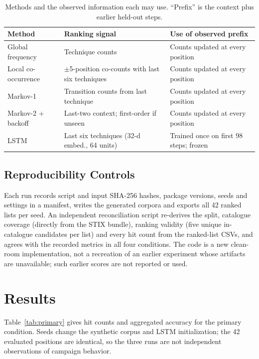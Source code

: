 \documentclass[conference]{IEEEtran}
\begin{document}
\begin{table}[!t]
\caption{Methods and the observed information each may use. ``Prefix'' is the context plus earlier held-out steps.}
\label{tab:methods}
\centering
\begin{tabular}{|l|p{4.2cm}|p{3.5cm}|}
\hline
\textbf{Method} & \textbf{Ranking signal} & \textbf{Use of observed prefix} \\
\hline
Global frequency & Technique counts & Counts updated at every position \\
Local co-occurrence & $\pm$5-position co-counts with last six techniques & Counts updated at every position \\
Markov-1 & Transition counts from last technique & Counts updated at every position \\
Markov-2 + backoff & Last-two context; first-order if unseen & Counts updated at every position \\
LSTM & Last six techniques (32-d embed., 64 units) & Trained once on first 98 steps; frozen \\
\hline
\end{tabular}
\end{table}

\subsection{Reproducibility Controls}

Each run records script and input SHA-256 hashes, package versions, seeds and settings in a manifest, writes the generated corpora and exports all 42 ranked lists per seed. An independent reconciliation script re-derives the split, catalogue coverage (directly from the STIX bundle), ranking validity (five unique in-catalogue candidates per list) and every hit count from the ranked-list CSVs, and agrees with the recorded metrics in all four conditions. The code is a new clean-room implementation, not a recreation of an earlier experiment whose artifacts are unavailable; such earlier scores are not reported or used.

\section{Results}

Table~\ref{tab:primary} gives hit counts and aggregated accuracy for the primary condition. Seeds change the synthetic corpus and LSTM initialization; the 42 evaluated positions are identical, so the three runs are not independent observations of campaign behavior.
\end{document}

